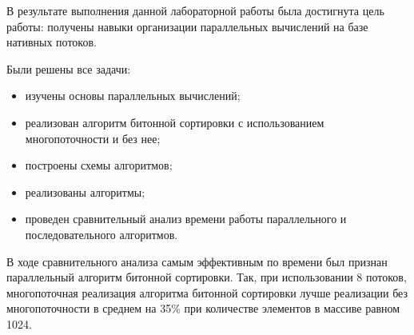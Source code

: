 \Conclusion %

В результате выполнения данной лабораторной работы была достигнута цель работы: получены навыки организации параллельных вычислений на базе нативных потоков.

Были решены все задачи:
\begin{itemize}
	\item изучены основы параллельных вычислений;
	\item реализован алгоритм битонной сортировки с использованием многопоточности и без нее;
	\item построены схемы алгоритмов;
	\item реализованы алгоритмы;
	\item проведен сравнительный анализ времени работы параллельного и последовательного алгоритмов.
\end{itemize}

В ходе сравнительного анализа самым эффективным по времени был признан параллельный алгоритм битонной сортировки. Так, при использовании 8 потоков, многопоточная реализация алгоритма битонной сортировки лучше реализации без многопоточности в среднем на 35\% при количестве элементов в массиве равном 1024.  
